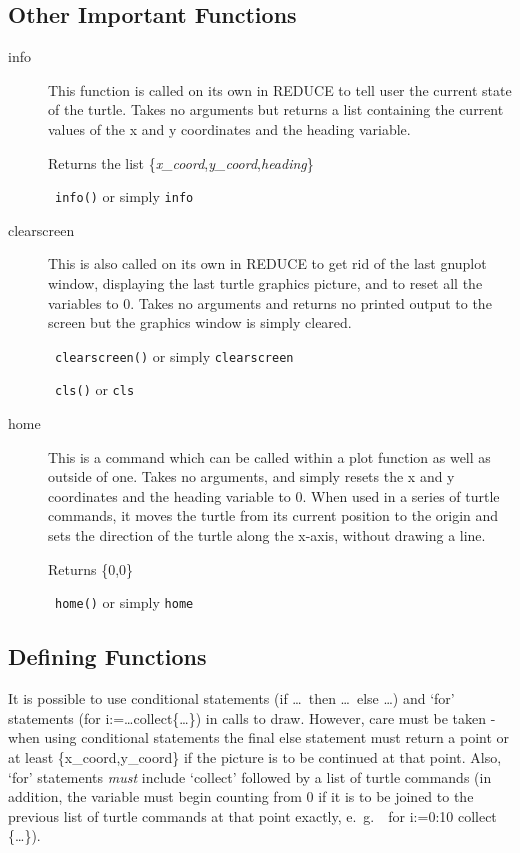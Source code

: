 \subsection{Other Important Functions}
\begin{description}
 \item[info] This function is called on its own in {\small REDUCE} to tell
       user the current state of the turtle. Takes no arguments but
       returns a list containing the current values of the x and y
       coordinates and the heading variable.

       Returns the list \{{\it x\_coord},{\it y\_coord},{\it heading}\}

       \syntax\ {\tt info()} or simply {\tt info}
 \item[clearscreen] This is also called on its own in {\small REDUCE} to
       get rid of the last gnuplot window, displaying the last turtle
       graphics picture, and to reset all the variables to 0. Takes no
       arguments and returns no printed output to the screen but the
       graphics window is simply cleared.

       \syntax\ {\tt clearscreen()} or simply {\tt clearscreen}

       \abb\ {\tt cls()} or {\tt cls}
 \item[home] This is a command which can be called within a plot function
       as well as outside of one. Takes no arguments, and simply resets
       the x and y coordinates and the heading variable to 0. When used in 
       a series of turtle commands, it moves the turtle from its current
       position to the origin and sets the direction of the turtle along
       the x-axis, without drawing a line.

       Returns \{0,0\}

       \syntax\ {\tt home()} or simply {\tt home}
\end{description}

\subsection{Defining Functions}

  It is possible to use conditional statements (if \ldots\ then \ldots\
else \ldots) and `for' statements (for i:=\ldots collect\{\ldots\}) in
calls to draw. However, care must be taken - when using conditional
statements the final else statement must return a point or at least
\{x\_coord,y\_coord\} if the picture is to be continued at that point.
Also, `for' statements {\em must} include `collect' followed by a list of
turtle commands (in addition, the variable must begin counting from 0 if
it is to be joined to the previous list of turtle commands at that point
exactly, e.\ g.\ \ for i:=0:10 collect \{\ldots\}).



